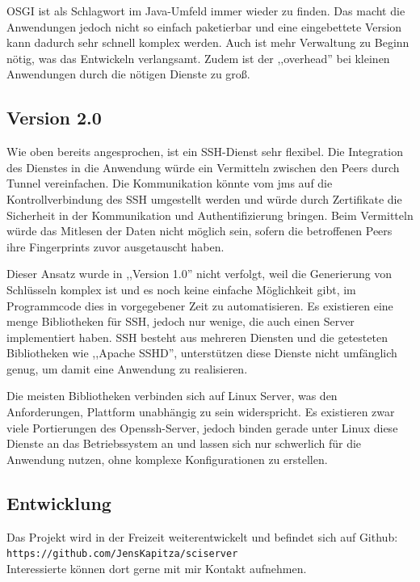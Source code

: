 \documentclass[oneside, ngerman, toc=bibliography,bibliography=totoc,listof=entryprefix, open=right,numbers=noenddot,fontsize=12pt]{scrbook}
\begin{document}
OSGI ist als Schlagwort im Java-Umfeld immer wieder zu finden. Das macht die Anwendungen jedoch nicht so einfach paketierbar und eine eingebettete Version kann dadurch sehr schnell komplex werden. Auch ist mehr Verwaltung zu Beginn nötig, was das Entwickeln verlangsamt. Zudem ist der ,,overhead'' bei kleinen Anwendungen durch die nötigen Dienste zu groß.

\subsection{Version 2.0}
Wie oben bereits angesprochen, ist ein SSH-Dienst sehr flexibel. Die Integration des Dienstes in die Anwendung würde ein Vermitteln zwischen den Peers durch Tunnel vereinfachen. Die Kommunikation könnte vom \acrshort{jms} auf die Kontrollverbindung des SSH umgestellt werden und würde durch Zertifikate die Sicherheit in der Kommunikation und Authentifizierung bringen. Beim Vermitteln würde das Mitlesen der Daten nicht möglich sein, sofern die betroffenen Peers ihre Fingerprints zuvor ausgetauscht haben.

Dieser Ansatz wurde in ,,Version 1.0'' nicht verfolgt, weil die Generierung von Schlüsseln komplex ist und es noch keine einfache Möglichkeit gibt, im Programmcode dies in vorgegebener Zeit zu automatisieren.
Es existieren eine menge Bibliotheken für SSH, jedoch nur wenige, die auch einen Server implementiert haben.
SSH besteht aus mehreren Diensten und die getesteten Bibliotheken wie ,,Apache SSHD'', unterstützen diese Dienste nicht umfänglich genug, um damit eine Anwendung zu realisieren.

Die meisten Bibliotheken verbinden sich auf Linux Server, was den Anforderungen, Plattform unabhängig zu sein widerspricht. Es existieren zwar viele Portierungen des Openssh-Server, jedoch binden gerade unter Linux diese Dienste an das Betriebssystem an und lassen sich nur schwerlich für die Anwendung nutzen, ohne komplexe Konfigurationen zu erstellen.

\subsection{Entwicklung}
Das Projekt wird in der Freizeit weiterentwickelt und befindet sich auf Github:\\
 \verb|https://github.com/JensKapitza/sciserver| \\ 
Interessierte können dort gerne mit mir Kontakt aufnehmen.

\bigskip
\end{document}
